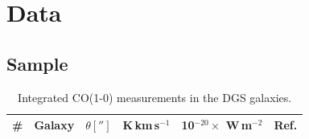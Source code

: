 \documentclass{aa}
\begin{document}
\section{Data}
\label{section_observations}
\subsection{Sample}
\label{section_sample}

\begin{table}[t!]
\begin{threeparttable}
\centering
\caption[Integrated measurements in the DGS.]{Integrated CO(1-0) measurements in the DGS galaxies.}
\label{table_CO_dgs}

\begin{tabular}{p{}p{}p{}p{}p{}p{}}
\# & Galaxy & $\theta ['']$ & K\,km\,s$^{-1}$ & 10$^{-20} \times$ W\,m$^{-2}$ & Ref.\\ \hline 


\end{tabular}
\end{threeparttable}
\end{table}
\end{document}
